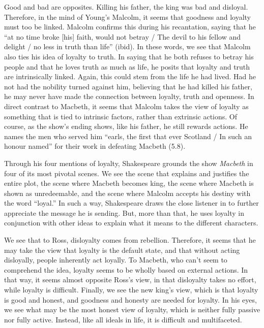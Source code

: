 \documentclass[12pt]{article}[titlepage]
\newcommand{\say}[1]{``#1''}
\newcommand{\1}{\={a}}
\newcommand{\2}{\={e}}
\newcommand{\3}{\={\i}}
\newcommand{\4}{\=o}
\newcommand{\5}{\=u}
\newcommand{\6}{\={A}}
\renewcommand{\,}{\textsuperscript{,}}
\begin{document}
Good and bad are opposites.
Killing his father, the king was bad and disloyal.
Therefore, in the mind of Young's Malcolm, it seems that goodness and loyalty must too be linked.
Malcolm confirms this during his recantation, saying that he \say{at no time broke [his] faith, would not betray / The devil to his fellow and delight / no less in truth than life} (ibid).
In these words, we see that Malcolm also ties his idea of loyalty to truth.
In saying that he both refuses to betray his people and that he loves truth as much as life, he posits that loyalty and truth are intrinsically linked.
Again, this could stem from the life he had lived.
Had he not had the nobility turned against him, believing that he had killed his father, he may never have made the connection between loyalty, truth and openness.
In direct contrast to Macbeth, it seems that Malcolm takes the view of loyalty as something that is tied to intrinsic factors, rather than extrinsic actions.
Of course, as the show's ending shows, like his father, he still rewards actions.
He names the men who served him \say{earls, the first that ever Scotland / In such an honour named} for their work in defeating Macbeth (5.8).

Through his four mentions of loyalty, Shakespeare grounds the show \textit{Macbeth} in four of its most pivotal scenes.
We see the scene that explains and justifies the entire plot, the scene where Macbeth becomes king, the scene where Macbeth is shown as unredeemable, and the scene where Malcolm accepts his destiny with the word \say{loyal.}
In such a way, Shakespeare draws the close listener in to further appreciate the message he is sending.
But, more than that, he uses loyalty in conjunction with other ideas to explain what it means to the different characters.

We see that to Ross, disloyalty comes from rebellion.
Therefore, it seems that he may take the view that loyalty is the default state, and that without acting disloyally, people inherently act loyally.
To Macbeth, who can't seem to comprehend the idea, loyalty seems to be wholly based on external actions.
In that way, it seems almost opposite Ross's view, in that disloyalty takes no effort, while loyalty is difficult.
Finally, we see the new king's view, which is that loyalty is good and honest, and goodness and honesty are needed for loyalty.
In his eyes, we see what may be the most honest view of loyalty, which is neither fully passive nor fully active.
Instead, like all ideals in life, it is difficult and multifaceted.
\end{document}
